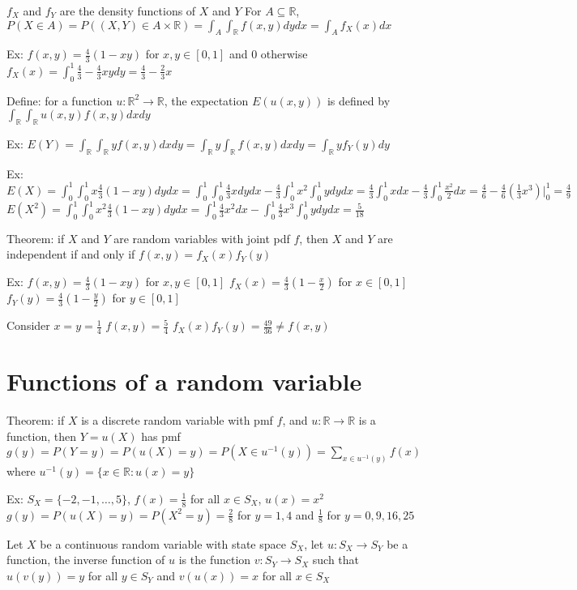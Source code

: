 \documentclass{article}
\begin{document}
$f_X$ and $f_Y$ are the density functions of $X$ and $Y$
For $A\subseteq\mathbb{R}$, $P(X\in A)=P((X,Y)\in A\times\mathbb{R})=\int_A\int_\mathbb{R}f(x,y)dydx=\int_Af_X(x)dx$

Ex: $f(x,y)=\frac{4}{3}(1-xy)$ for $x,y\in[0,1]$ and $0$ otherwise
$f_X(x)=\int_0^1\frac{4}{3}-\frac{4}{3}xydy=\frac{4}{3}-\frac{2}{3}x$

Define: for a function $u:\mathbb{R}^2\to\mathbb{R}$, the expectation $E(u(x,y))$ is defined by $\int_\mathbb{R}\int_\mathbb{R}u(x,y)f(x,y)dxdy$

Ex: $E(Y)=\int_\mathbb{R}\int_\mathbb{R}yf(x,y)dxdy=\int_\mathbb{R}y\int_\mathbb{R}f(x,y)dxdy=\int_\mathbb{R}yf_Y(y)dy$

Ex:
$E(X)=\int_0^1\int_0^1x\frac{4}{3}(1-xy)dydx=\int_0^1\int_0^1\frac{4}{3}xdydx-\frac{4}{3}\int_0^1x^2\int_0^1ydydx=\frac{4}{3}\int_0^1xdx-\frac{4}{3}\int_0^1\frac{x^2}{2}dx=\frac{4}{6}-\frac{4}{6}(\frac{1}{3}x^3)\rvert_0^1=\frac{4}{9}$
$E(X^2)=\int_0^1\int_0^1x^2\frac{4}{3}(1-xy)dydx=\int_0^1\frac{4}{3}x^2dx-\int_0^1\frac{4}{3}x^3\int_0^1ydydx=\frac{5}{18}$

Theorem: if $X$ and $Y$ are random variables with joint pdf $f$, then $X$ and $Y$ are independent if and only if $f(x,y)=f_X(x)f_Y(y)$

Ex: $f(x,y)=\frac{4}{3}(1-xy)$ for $x,y\in[0,1]$
$f_X(x)=\frac{4}{3}(1-\frac{x}{2})$ for $x\in[0,1]$
$f_Y(y)=\frac{4}{3}(1-\frac{y}{2})$ for $y\in[0,1]$

Consider $x=y=\frac{1}{4}$
$f(x,y)=\frac{5}{4}$
$f_X(x)f_Y(y)=\frac{49}{36}\neq f(x,y)$

\section{Functions of a random variable}

Theorem: if $X$ is a discrete random variable with pmf $f$, and $u:\mathbb{R}\to\mathbb{R}$ is a function, then $Y=u(X)$ has pmf $g(y)=P(Y=y)=P(u(X)=y)=P(X\in u^{-1}(y))=\sum_{x\in u^{-1}(y)}f(x)$ where $u^{-1}(y)=\{x\in\mathbb{R}:u(x)=y\}$

Ex: $S_X=\{-2,-1,\dots,5\}$, $f(x)=\frac{1}{8}$ for all $x\in S_X$, $u(x)=x^2$
$g(y)=P(u(X)=y)=P(X^2=y)=\frac{2}{8}$ for $y=1,4$ and $\frac{1}{8}$ for $y=0,9,16,25$

Let $X$ be a continuous random variable with state space $S_X$, let $u:S_X\to S_Y$ be a function, the inverse function of $u$ is the function $v:S_Y\to S_X$ such that $u(v(y))=y$ for all $y\in S_Y$ and $v(u(x))=x$ for all $x\in S_X$
\end{document}
